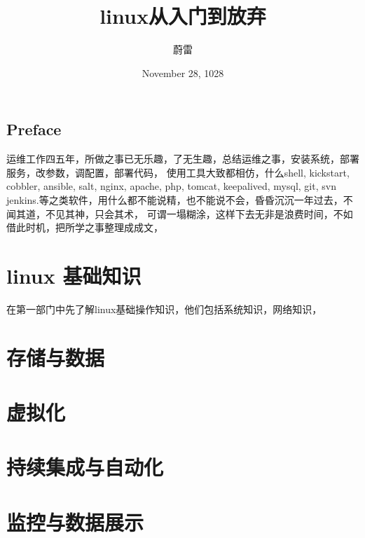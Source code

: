\documentclass[11pt,a4paper,oneside]{book}
\title{linux从入门到放弃}
\author{蔚雷}
\date{November 28, 1028}
\begin{document}
\maketitle

\tableofcontents 

\mainmatter

\chapter*{Preface} 
运维工作四五年，所做之事已无乐趣，了无生趣，总结运维之事，安装系统，部署服务，改参数，调配置，部署代码，
使用工具大致都相仿，什么shell, kickstart, cobbler, ansible, salt, nginx, apache, php, tomcat, keepalived, mysql, git, svn 
jenkins.等之类软件，用什么都不能说精，也不能说不会，昏昏沉沉一年过去，不闻其道，不见其神，只会其术，
可谓一塌糊涂，这样下去无非是浪费时间，不如借此时机，把所学之事整理成成文，

\part{linux 基础知识}

在第一部门中先了解linux基础操作知识，他们包括系统知识，网络知识，








\part{存储与数据}



\part{虚拟化}



\part{持续集成与自动化}


\part{监控与数据展示}


\end{document}
